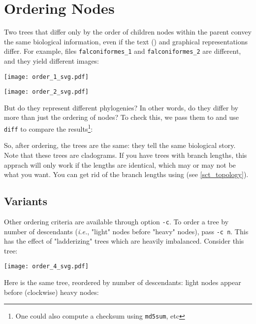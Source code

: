 \section{Ordering Nodes}
\label{sct_order}

Two trees that differ only by the order of children nodes within the parent
convey the same biological information, even if the text (\nw) and graphical
representations differ.  For example, files \texttt{falconiformes\_1} and
\texttt{falconiformes\_2} are different, and they yield different images:


\begin{center}
\texttt{[image: order\_1\_svg.pdf]}
\end{center}


\begin{center}
\texttt{[image: order\_2\_svg.pdf]}
\end{center}

\noindent{}But do they represent different phylogenies? In other words, do they
differ by more than just the ordering of nodes? To check this, we pass them to
\order{} and use \texttt{diff} to compare the results\footnote{One could also compute a checksum using \texttt{md5sum}, etc}:




So, after ordering, the trees are the same: they tell the same biological
story. Note that these trees are cladograms. If you have trees with branch
lengths, this apprach will only work if the lengths are identical, which may or
may not be what you want. You can get rid of the branch lengths using
\topology{} (see \ref{sct_topology}).

\subsection{Variants}

Other ordering criteria are available through option \texttt{-c}. To order a
tree by number of descendants (\textit{i.e.}, "light" nodes before "heavy"
nodes), pass \texttt{-c n}. This has the effect of "ladderizing" trees which are
heavily imbalanced. Consider this tree:

\begin{center}
\texttt{[image: order\_4\_svg.pdf]}
\end{center}

\noindent{}Here is the same tree, reordered by number of descendants: light
nodes appear before (clockwise) heavy nodes:

